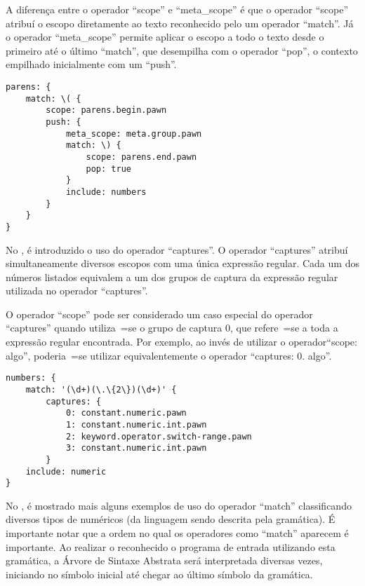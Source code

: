 A diferença entre o operador ``scope'' e
``meta\_scope'' é que o operador ``scope'' atribuí o escopo diretamente ao texto reconhecido pelo um operador ``match''.
Já o operador ``meta\_scope'' permite aplicar o escopo a todo o texto desde o primeiro até o último ``match'',
que desempilha com o operador ``pop'',
o contexto empilhado inicialmente com um ``push''.
\begin{lstlisting}[caption={Exemplo de Gramática -- Contextos},label={exemploDeGramaticaPawn2},style=yaml_style]
parens: {
    match: \( {
        scope: parens.begin.pawn
        push: {
            meta_scope: meta.group.pawn
            match: \) {
                scope: parens.end.pawn
                pop: true
            }
            include: numbers
        }
    }
}
\end{lstlisting}

No ,
é introduzido o uso do operador ``captures''.
O operador ``captures'' atribuí simultaneamente diversos escopos com uma única expressão regular.
Cada um dos números listados equivalem a um dos grupos de captura \cite{expressionGrammarsWithRegexLikeCaptures} da expressão regular utilizada no operador ``captures''.

O operador ``scope'' pode ser considerado um caso especial do operador ``captures'' quando utiliza~=se o grupo de captura 0,
que refere~=se a toda a expressão regular encontrada.
Por exemplo,
ao invés de utilizar o operador``scope:
algo'',
poderia~=se utilizar equivalentemente o operador ``captures:
0.
algo''.
\begin{lstlisting}[caption={Exemplo de Gramática -- Grupos de Captura},label={exemploDeGramaticaPawn3},style=yaml_style]
numbers: {
    match: '(\d+)(\.\{2\})(\d+)' {
        captures: {
            0: constant.numeric.pawn
            1: constant.numeric.int.pawn
            2: keyword.operator.switch-range.pawn
            3: constant.numeric.int.pawn
        }
    include: numeric
}
\end{lstlisting}

No ,
é mostrado mais alguns exemplos de uso do operador ``match'' classificando diversos tipos de numéricos (da linguagem sendo descrita pela gramática).
É importante notar que a ordem no qual os operadores como ``match'' aparecem é importante.
Ao realizar o reconhecido o programa de entrada utilizando esta gramática,
a Árvore de Sintaxe Abstrata será interpretada diversas vezes,
iniciando no símbolo inicial até chegar ao último símbolo da gramática.

